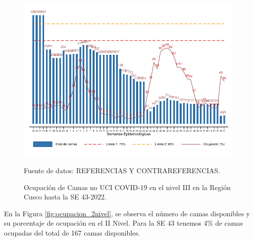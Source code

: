 \documentclass[12pt,a4paper,openany]{book}
\begin{document}
	\begin{figure}[htpb]
		\caption{Ocupación de Camas no UCI COVID-19 en el nivel III en la Región Cusco hasta la SE 43-2022.}\label{fig:ocupacion_3_nivel}
		\begin{center}
			\includegraphics[width=0.95\linewidth]{../figuras/nivel_3.pdf}
		\end{center}
		{\footnotesize {Fuente de datos: REFERENCIAS Y CONTRAREFERENCIAS.}}
	\end{figure}
	
	\clearpage
	
	En la Figura \ref{fig:ocupacion_2nivel}, se observa el número de camas disponibles y su porcentaje de ocupación en el II Nivel. Para la SE 43 tenemos 4$\%$ de camas ocupadas del total de 167 camas disponibles.
	
\end{document}

